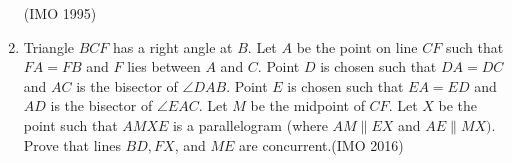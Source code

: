\begin{enumerate}[label=\thesubsection.\arabic*,ref=\thesubsection.\theenumi]
	\hfill (IMO  1995)
 \item Triangle $BCF$ has a right angle at $B$. Let $A$ be the point on line $CF$ such that $FA=FB$ and $F$ lies between $A$ and $C$. Point $D$ is chosen such that $DA = DC$ and $AC$ is the bisector of $\angle DAB$. Point $E$ is chosen such that $EA= ED$ and $AD$ is the bisector of $\angle EAC$. Let $M$ be the midpoint of $CF$. Let $X$ be the point such that $AMXE$ is a parallelogram (where $AM \parallel EX$ and $AE \parallel MX)$. Prove that lines $BD, FX$, and $ME$ are concurrent.\hfill (IMO  2016)

\end{enumerate}
